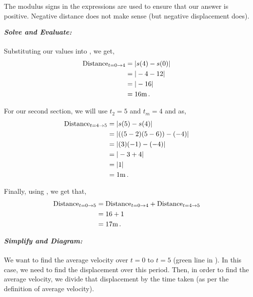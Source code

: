 \begin{subquestions}
\begin{subsubquestions}
\begin{subsubsubquestions}
The modulus signs in the expressions are used to ensure that our answer is positive. Negative distance does not make sense (but negative displacement does). 


\textbf{\textit{Solve and Evaluate:}} \\ \\
Substituting our values into , we get,
\begin{align}
	\text{Distance}_{t=0 \rightarrow 4} & = |s(4)-s(0)| \nonumber \\
							& = |-4-12| \nonumber \\
	                        & = |-16| \nonumber \\
	                        & = 16 \text{m} \,.
\end{align}

For our second section, we will use $t_2=5$ and $t_m=4$ and  as,
\begin{align}
	\text{Distance}_{t=4 \rightarrow 5} & = |s(5)-s(4)| \nonumber \\
	& = |((5-2)(5-6)) -(-4)| \nonumber \\
	& = |(3)(-1)-(-4)| \nonumber \\
	& = |-3+4| \nonumber \\
	& = |1| \nonumber \\
	& = 1 \text{m} \,.
\end{align}

Finally, using , we get that,
\begin{align}
	\text{Distance}_{t=0 \rightarrow 5} & = \text{Distance}_{t=0 \rightarrow 4} + \text{Distance}_{t=4 \rightarrow 5} \nonumber \\
	                        & = 16 + 1 \nonumber \\
	                        & = 17 \text{m} \,.
\end{align}


\subsubsubquestion

\textbf{\textit{Simplify and Diagram:}} \\ \\
We want to find the average velocity over $t=0$ to $t=5$ (green line in ). In this case, we need to find the displacement over this period. Then, in order to find the average velocity, we divide that displacement by the time taken (as per the definition of average velocity). \\


\end{subsubsubquestions}
\end{subsubquestions}
\end{subquestions}
